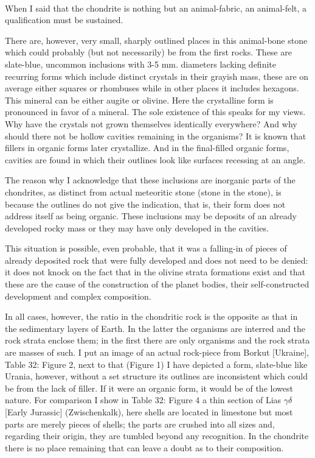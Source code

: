 \documentclass[a4paper, 11pt, oneside]{article}
\begin{document}
\paragraph{}
When I said that the chondrite is nothing but an animal-fabric, an animal-felt, a qualification must be sustained.

There are, however, very small, sharply outlined places in this animal-bone stone which could probably (but not necessarily) be from the first rocks. These are slate-blue, uncommon inclusions with 3-5 mm. diameters lacking definite recurring forms which include distinct crystals in their grayish mass, these are on average either squares or rhombuses while in other places it includes hexagons. This mineral can be either augite or olivine. Here the crystalline form is pronounced in favor of a mineral. The sole existence of this speaks for my views. Why have the crystals not grown themselves identically everywhere? And why should there not be hollow cavities remaining in the organisms? It is known that fillers in organic forms later crystallize. And in the final-filled organic forms, cavities are found in which their outlines look like surfaces recessing at an angle.

The reason why I acknowledge that these inclusions are inorganic parts of the chondrites, as distinct from actual meteoritic stone (stone in the stone), is because the outlines do not give the indication, that is, their form does not address itself as being organic. These inclusions may be deposits of an already developed rocky mass or they may have only developed in the cavities.

This situation is possible, even probable, that it was a falling-in of pieces of already deposited rock that were fully developed and does not need to be denied: it does not knock on the fact that in the olivine strata formations exist and that these are the cause of the construction of the planet bodies, their self-constructed development and complex composition.

In all cases, however, the ratio in the chondritic rock is the opposite as that in the sedimentary layers of Earth. In the latter the organisms are interred and the rock strata enclose them; in the first there are only organisms and the rock strata are masses of such. I put an image of an actual rock-piece from Borkut [Ukraine], Table 32: Figure 2, next to that (Figure 1) I have depicted a form, slate-blue like Urania, however, without a set structure its outlines are inconsistent which could be from the lack of filler. If it were an organic form, it would be of the lowest nature. For comparison I show in Table 32: Figure 4 a thin section of Lias $\gamma\delta $ [Early Jurassic] (Zwischenkalk), here shells are located in limestone but most parts are merely pieces of shells; the parts are crushed into all sizes and, regarding their origin, they are tumbled beyond any recognition. In the chondrite there is no place remaining that can leave a doubt as to their composition.
\clearpage
\end{document}
